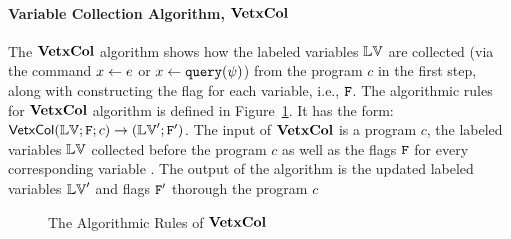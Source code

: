 \paragraph{Variable Collection Algorithm, $\bf{VetxCol}$}
The $\bf{VetxCol}$ algorithm shows how the labeled variables $\mathbb{LV}$ are collected 
(via the command ${\mathrel{ x \leftarrow e }}$ or ${\mathrel{ x \leftarrow {\tt query}(\psi) }}$) from the program ${c}$ in the first step, 
along with constructing the flag for each variable, i.e., $\mathtt{F}$.
The algorithmic rules for $\bf{VetxCol}$ algorithm is defined in Figure~\ref{fig:var_col}. 
It has the form: 
{$\mathsf{VetxCol}{(\mathbb{LV}; \mathtt{F}; {c})}\to {( \mathbb{LV}'; \ensuremath{\mathtt{F}}')} $}. 
The input of $\bf{VetxCol}$ is a program ${c}$, 
the labeled variables $\mathbb{LV}$ collected before the program ${c}$ 
as well as the flags $\mathtt{F}$ for every corresponding variable .
The output of the algorithm is the updated labeled variables $\mathbb{LV}'$ and flags $\mathtt{F}'$ thorough the program ${c}$
%
%
\begin{figure}
{
}
\caption{The Algorithmic Rules of $\bf{VetxCol}$ }
\label{fig:var_col}
\end{figure}
